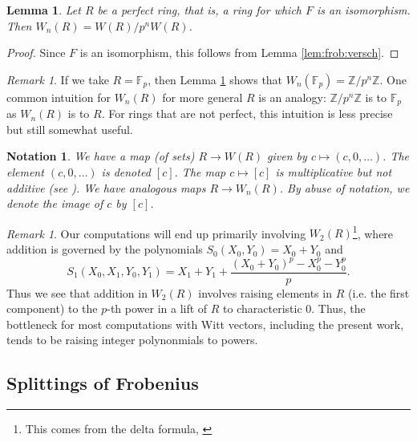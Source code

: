 \documentclass[a4paper]{article}
\newtheorem{lem}[thm]{Lemma}
\newtheorem{nota}[thm]{Notation}
\theoremstyle{definition}
\theoremstyle{remark}
\newtheorem{rmk}[thm]{Remark}
\begin{document}
\begin{lem}
    \label{lem:perfect:witt}
    Let \(R\) be a \textit{perfect} ring,
    that is, a ring for which \(F\) is an isomorphism.
    Then \(W_{n}(R) = W(R) / p^{n}W(R)\).
\end{lem}

\begin{proof}
    Since \(F\) is an isomorphism, this follows from 
    Lemma \ref{lem:frob:versch}.
\end{proof}

\begin{rmk}
    If we take \(R = \mathbb{F}_{p}\), then
    Lemma \ref{lem:perfect:witt}
    shows that \(W_{n}(\mathbb{F}_{p}) = \mathbb{Z} / p^{n}\mathbb{Z}\).
    One common intuition for \(W_{n}(R)\)
    for more general \(R\) is an analogy:
    \(\mathbb{Z} / p^{n}\mathbb{Z}\) 
    is to \(\mathbb{F}_{p}\) 
    as \(W_{n}(R)\) is to \(R\).
    For rings that are not perfect,
    this intuition is less precise but still
    somewhat useful.
\end{rmk}

\begin{nota}
    We have a map (of sets) 
    \(R \xrightarrow{} W(R)\) 
    given by 
    \(c \mapsto (c, 0, \ldots)\).
    The element \((c, 0, \ldots)\) is denoted
    \([c]\).
    The map \(c \mapsto [c]\) is multiplicative
    but not additive (see \cite[Section~1]{kim-2017-witt-vec}).
    We have analogous maps \(R \xrightarrow{} W_{n}(R)\).
    By abuse of notation, we denote 
    the image of \(c\) by \([c]\).
\end{nota}


\begin{rmk}
	\label{rmk:polyraise:w2}
    Our computations will end up primarily involving
    \(W_{2}(R)\)\footnote{
    This comes from the delta formula,
    \cite[Theorem~D]{kty-2022-fedder}},
    where addition is governed by the polynomials
	\(S_{0}(X_{0}, Y_{0}) = X_{0} + Y_{0}\)
	and
	\[
		S_{1}(X_{0}, X_{1}, Y_{0}, Y_{1})
		= X_{1} + Y_{1} + 
		\frac{(X_{0} + Y_{0})^{p} - X_{0}^{p} - Y_{0}^{p}}{p}
	.\] 
	Thus we see that addition in \(W_{2}(R)\) involves raising 
	elements in \(R\) (i.e. the first component) to the \(p\)-th
	power in a lift of \(R\) to characteristic 0.
    Thus, the bottleneck for most computations with Witt vectors,
    including the present work, tends to be raising
    integer polynonmials to powers.
\end{rmk}

\subsection{Splittings of Frobenius}
\label{subsec:split:frob}
\end{document}
